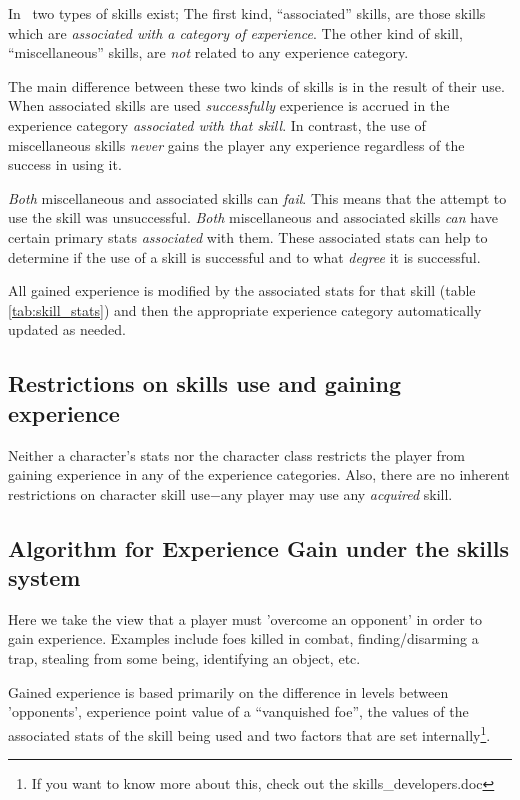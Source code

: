In \cf\ two types of skills exist; The first kind, ``associated''
skills, are those skills which are {\em associated with a category of 
experience}.  The other kind of skill, ``miscellaneous'' skills,
are {\em not} related to any experience category.

The main difference between these two kinds of skills is in the 
result of their use.
When associated skills are used {\em successfully} experience is 
accrued in the experience category {\em associated with that skill}. 
In contrast, the use of miscellaneous skills {\em never} gains
the player any experience regardless of the success in using it.

{\em Both} miscellaneous and associated skills can {\em fail}. This means
that the attempt to use the skill was unsuccessful. {\em Both} 
miscellaneous and associated skills {\em can} have certain
primary stats {\em associated} with them. These associated stats can help   
to determine if the use of a skill is successful and to what
{\em degree} it is successful. 

All gained experience is modified by the associated 
stats for that skill (table \ref{tab:skill_stats}) and then the 
appropriate experience category automatically updated as needed.

\subsection{Restrictions on skills use and gaining experience}

Neither a character's stats nor the character class restricts the
player from gaining experience in any of the experience 
categories. Also, there are no inherent 
restrictions on character skill use$-$any player may
use any {\em acquired} skill. 

\subsection{Algorithm for Experience Gain under the skills system}

Here we take the view that a player must 'overcome an opponent'
in order to gain experience. Examples include foes killed in combat,
finding/disarming a trap, stealing from some being, identifying 
an object, etc.

Gained experience is based primarily on the difference in levels 
between 'opponents', experience point value of a ``vanquished foe'', 
the values of the associated stats of the skill being used and 
two factors that are set internally\footnote{If you want to 
know more about this, check out the skills\_developers.doc}.

